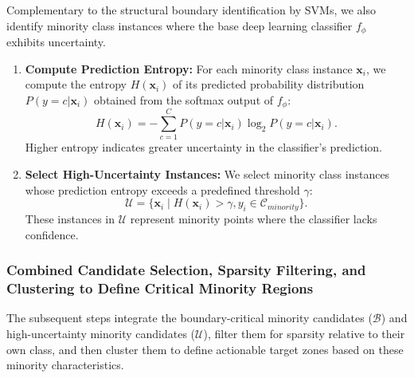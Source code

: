 \documentclass{article}
\begin{document}
Complementary to the structural boundary identification by SVMs, we also identify minority class instances where the base deep learning classifier $f_\phi$ exhibits uncertainty.

\begin{enumerate}
    \item \textbf{Compute Prediction Entropy:} For each minority class instance $\mathbf{x}_i$, we compute the entropy $H(\mathbf{x}_i)$ of its predicted probability distribution $P(y=c|\mathbf{x}_i)$ obtained from the softmax output of $f_\phi$:
    \begin{equation}
    H(\mathbf{x}_i) = -\sum_{c=1}^C P(y=c|\mathbf{x}_i) \log_2 P(y=c|\mathbf{x}_i).
    \end{equation}
    Higher entropy indicates greater uncertainty in the classifier's prediction.

    \item \textbf{Select High-Uncertainty Instances:} We select minority class instances whose prediction entropy exceeds a predefined threshold $\gamma$:
    \begin{equation}
    \mathcal{U} = \{\mathbf{x}_i \mid H(\mathbf{x}_i) > \gamma, y_i \in \mathcal{C}_{minority}\}.
    \end{equation}
    These instances in $\mathcal{U}$ represent minority points where the classifier lacks confidence.
\end{enumerate}

\subsubsection{Combined Candidate Selection, Sparsity Filtering, and Clustering to Define Critical Minority Regions}
\label{sssec:combined_selection_clustering}

The subsequent steps integrate the boundary-critical minority candidates ($\mathcal{B}$) and high-uncertainty minority candidates ($\mathcal{U}$), filter them for sparsity relative to their own class, and then cluster them to define actionable target zones based on these minority characteristics.
\end{document}
